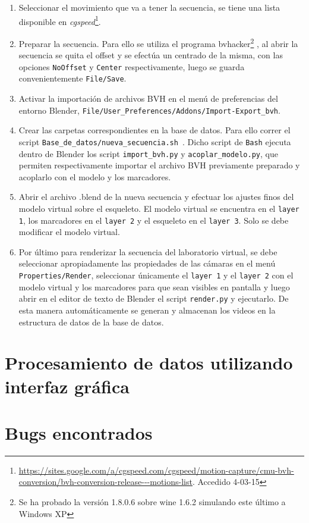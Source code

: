  \begin{enumerate}
 \item Seleccionar el movimiento que va a tener la secuencia, se tiene una  lista disponible en \textit{cgspeed}\footnote{{\tiny \textcolor{blue}{\underline{\url{https://sites.google.com/a/cgspeed.com/cgspeed/motion-capture/cmu-bvh-conversion/bvh-conversion-release---motions-list}}}}. Accedido 4-03-15}. 
 \item Preparar la secuencia. Para ello se utiliza el programa bvhacker\footnote{Se ha probado la versión 1.8.0.6 sobre wine 1.6.2 simulando este último a Windows XP} \cite{bvhacker}, al abrir la secuencia se quita el offset y se efectúa un centrado de la misma, con las opciones \texttt{NoOffset} y \texttt{Center} respectivamente, luego se guarda convenientemente \texttt{File/Save}.
 \item Activar la importación de archivos BVH en el menú de preferencias del entorno Blender, \texttt{File/User\_Preferences/Addons/Import-Export\_bvh}.
 \item Crear las carpetas correspondientes en la base de datos. Para ello correr el script \texttt{Base\_de\_datos/nueva\_secuencia.sh }. Dicho script de \texttt{Bash} ejecuta dentro de Blender los script \texttt{import\_bvh.py} y \texttt{acoplar\_modelo.py}, que permiten respectivamente importar el archivo BVH previamente preparado y acoplarlo con el modelo y los marcadores.
 \item Abrir el archivo .blend de la nueva secuencia  y efectuar los ajustes finos del modelo virtual sobre el esqueleto. El modelo virtual se encuentra en el \texttt{layer 1}, los marcadores en el \texttt{layer 2}  y el esqueleto en el \texttt{layer 3}. Solo se debe modificar el modelo virtual.
 \item Por último para renderizar la secuencia del laboratorio virtual, se debe seleccionar apropiadamente las propiedades de las cámaras en el menú\\ \texttt{Properties/Render}, seleccionar únicamente el \texttt{layer 1} y el \texttt{layer 2} con el modelo virtual y los marcadores para que sean  visibles en pantalla y luego abrir en el editor de texto de Blender el script \texttt{render.py} y ejecutarlo. De esta manera automáticamente se generan y almacenan los videos en la estructura de datos de la base de datos.
 
 \end{enumerate}
 
 \section{Procesamiento de datos utilizando interfaz gráfica}
 
 \section{Bugs encontrados}